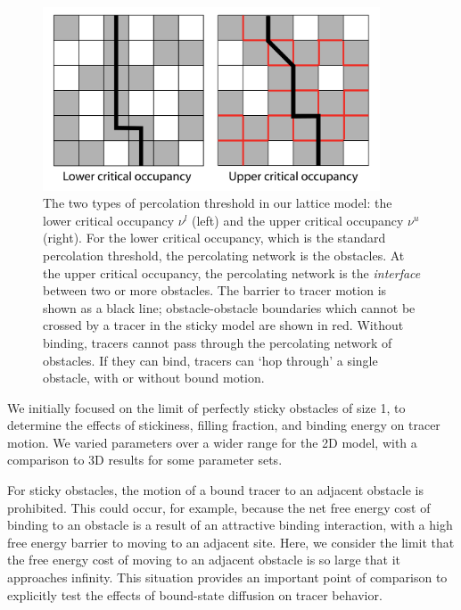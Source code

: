 \begin{figure}[!ht]
  \begin{center}
	  \includegraphics[width=100mm]{figs/ch02_soft/soft_percolation.png}
  \end{center}
	\caption[Percolation threshold]
    {The two types of percolation threshold in our lattice
    model: the lower critical occupancy $ \nu^l $ (left) and the upper
    critical occupancy $ \nu^u $ (right). For the lower critical
    occupancy, which is the standard percolation threshold, the
    percolating network is the obstacles. At the upper critical
    occupancy, the percolating network is the \textit{interface}
    between two or more obstacles. The barrier to tracer motion is
    shown as a black line; obstacle-obstacle boundaries which cannot
    be crossed by a tracer in the sticky model are shown in
    red. Without binding, tracers cannot pass through the 
    percolating network of obstacles. If they can bind, tracers can `hop through'
    a single obstacle, with or without bound motion.}\label{fig:percolation}
\end{figure}

We initially focused on the limit of perfectly sticky obstacles of size 1, to
determine the effects of stickiness, filling fraction, and binding energy on
tracer motion. We varied parameters over a wider range for the 2D model, with a
comparison to 3D results for some parameter sets.

For sticky obstacles, the motion of a bound tracer to an adjacent obstacle is
prohibited.  This could occur, for example, because the net free energy cost of
binding to an obstacle is a result of an attractive binding interaction, with a
high free energy barrier to moving to an adjacent site.  Here, we consider the
limit that the free energy cost of moving to an adjacent obstacle is so large
that it approaches infinity.  This situation provides an important point of
comparison to explicitly test the effects of bound-state diffusion on tracer
behavior.


